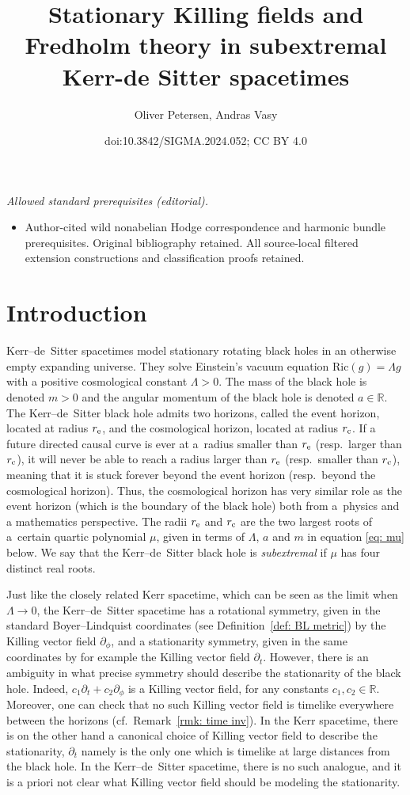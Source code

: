 \documentclass[10pt,a4paper]{amsart}
\title{Stationary Killing fields and Fredholm theory in subextremal Kerr-de Sitter spacetimes}
\author{Oliver Petersen, Andras Vasy}
\date{doi:10.3842/SIGMA.2024.052; CC BY 4.0}
\newcommand{\Ric}{\mathrm{Ric}}
\renewcommand{\d}{\partial}
\newcommand{\R}[0]{\mathbb{R}}
\numberwithin{equation}{section}
\begin{document}
\maketitle
\noindent\textit{Allowed standard prerequisites (editorial).}\begin{itemize}
\item Author-cited wild nonabelian Hodge correspondence and harmonic bundle prerequisites. Original bibliography retained. All source-local filtered extension constructions and classification proofs retained.
\end{itemize}\medskip
\section{Introduction}

Kerr--de~Sitter spacetimes model stationary rotating black holes in an otherwise empty expanding universe.
They solve Einstein's vacuum equation $\Ric(g) = \Lambda g$ with a positive cosmological constant $\Lambda > 0$.
The mass of the black hole is denoted $m > 0$ and the angular momentum of the black hole is denoted $a \in \R$.
The Kerr--de~Sitter black hole admits two horizons, called the event horizon, located at radius $r_{\rm e}$, and the cosmological horizon, located at radius $r_{\rm c}$.
If a future directed causal curve is ever at a~radius smaller than $r_{\rm e}$ (resp.~larger than $r_{\rm c}$), it will never be able to reach a radius larger than $r_{\rm e}$ (resp.~smaller than $r_{\rm c}$), meaning that it is stuck forever beyond the event horizon (resp.~beyond the cosmological horizon).
Thus, the cosmological horizon has very similar role as the event horizon (which is the boundary of the black hole) both from a~physics and a mathematics perspective.
The radii $r_{\rm e}$ and $r_{\rm c}$ are the two largest roots of a~certain quartic polynomial $\mu$, given in terms of $\Lambda$, $a$ and $m$ in equation \eqref{eq: mu} below.
We say that the Kerr--de~Sitter black hole is \emph{subextremal} if $\mu$ has four distinct real roots.

Just like the closely related Kerr spacetime, which can be seen as the limit when $\Lambda \to 0$, the Kerr--de~Sitter spacetime has a rotational symmetry, given in the standard Boyer--Lindquist coordinates (see Definition~\ref{def: BL metric}) by the Killing vector field $\d_\phi$, and a stationarity symmetry, given in the same coordinates by for example the Killing vector field $\d_t$.
However, there is an ambiguity in what precise symmetry should describe the stationarity of the black hole.
Indeed,
$c_1 \d_t + c_2 \d_\phi$
is a Killing vector field, for any constants $c_1, c_2 \in \R$.
Moreover, one can check that no such Killing vector field is timelike everywhere between the horizons (cf.~Remark~\ref{rmk: time inv}).
In the Kerr spacetime, there is on the other hand a canonical choice of Killing vector field to describe the stationarity, $\d_t$ namely is the only one which is timelike at large distances from the black hole.
In the Kerr--de~Sitter spacetime, there is no such analogue, and it is a priori not clear what Killing vector field should be modeling the stationarity.
\end{document}
